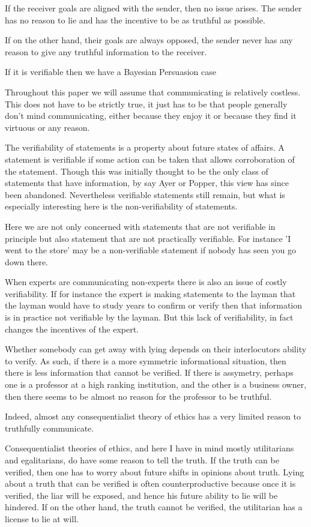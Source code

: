 \documentclass[11pt]{article}
\numberwithin{equation}{section}
\begin{document}
If the receiver goals are aligned with the sender, then no issue arises. The sender has no reason to lie and has the incentive to be as truthful as possible. 

If on the other hand, their goals are always opposed, the sender never has any reason to give any truthful information to the receiver. 

If it is verifiable then we have a Bayesian Persuasion case

Throughout this paper we will assume that communicating is relatively costless. This does not have to be strictly true, it just has to be that people generally don't mind communicating, either because they enjoy it or because they find it virtuous or any reason. 

The verifiability of statements is a property about future states of affairs. A statement is verifiable if some action can be taken that allows corroboration of the statement. Though this was initially thought to be the only class of statements that have information, by say Ayer or Popper, this view has since been abandoned. Nevertheless verifiable statements still remain, but what is especially interesting here is the non-verifiability of statements. 

Here we are not only concerned with statements that are not verifiable in principle but also statement that are not practically verifiable. For instance 'I went to the store' may be a non-verifiable statement if nobody has seen you go down there. 

When experts are communicating non-experts there is also an issue of costly verifiability. If for instance the expert is making statements to the layman that the layman would have to study years to confirm or verify then that information is in practice not verifiable by the layman. But this lack of verifiability, in fact changes the incentives of the expert. 

Whether somebody can get away with lying depends on their interlocutors ability to verify. As such, if there is a more symmetric informational situation, then there is less information that cannot be verified. If there is assymetry, perhaps one is a professor at a high ranking institution, and the other is a business owner, then there seems to be almost no reason for the professor to be truthful. 

Indeed, almost any consequentialist theory of ethics has a very limited reason to truthfully communicate. 

Consequentialist theories of ethics, and here I have in mind mostly utilitarians and egalitarians, do have some reason to tell the truth. If the truth can be verified, then one has to worry about future shifts in opinions about truth. Lying about a truth that can be verified is often counterproductive because once it is verified, the liar will be exposed, and hence his future ability to lie will be hindered. If on the other hand, the truth cannot be verified, the utilitarian has a license to lie at will. 
\end{document}
